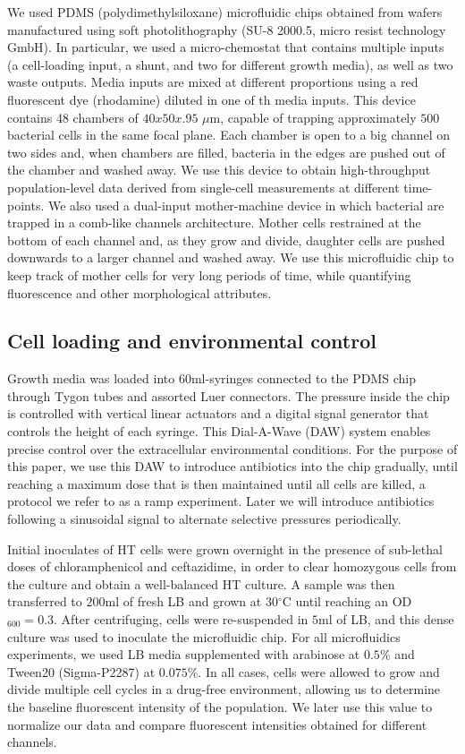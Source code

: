 \documentclass[fleqn,12pt]{wlscirep}
\begin{document}
We used PDMS (polydimethylsiloxane) microfluidic chips obtained from wafers manufactured using soft photolithography (SU-8 2000.5, micro resist technology GmbH).
In particular, we used a micro-chemostat \cite{mondragon2011entrainment} that contains multiple inputs (a cell-loading input, a shunt, and two for different growth media), as well as two waste outputs. Media inputs are mixed at different proportions using a red fluorescent dye (rhodamine) diluted in one of th media inputs. This device contains 48 chambers of $40x50x.95$ $\mu$m, capable of trapping approximately $500$ bacterial cells in the same focal plane.  
Each chamber is open to a big channel on two sides and, when chambers are filled, bacteria in the edges are pushed out of the chamber and washed away. We use this device to obtain high-throughput population-level data derived from single-cell measurements at different time-points.
We also used a dual-input mother-machine \cite{Kaiser2018} device in which bacterial are trapped in a comb-like channels architecture. Mother cells restrained at the bottom of each channel and, as they grow and divide, daughter cells are pushed downwards to a larger channel and washed away. We use this microfluidic chip to keep track of mother cells for very long periods of time, while quantifying fluorescence and other morphological attributes.

\subsection{Cell loading and environmental control}

Growth media was loaded into $60$ml-syringes connected to the PDMS chip through Tygon tubes and assorted Luer connectors. The pressure inside the chip is controlled with vertical linear actuators and a digital signal generator that controls the height of each syringe. 
This Dial-A-Wave (DAW) system\cite{Ferry2011} enables precise control over the extracellular environmental conditions. For the purpose of this paper, we use this DAW to introduce antibiotics into the chip gradually, until reaching a maximum dose that is then maintained until all cells are killed, a protocol we refer to as a ramp experiment.  Later we will introduce antibiotics following a sinusoidal signal to alternate selective pressures periodically.

Initial inoculates of HT cells were grown overnight in the presence of sub-lethal doses of chloramphenicol and ceftazidime, in order to clear homozygous cells from the culture and obtain a well-balanced HT culture.
A sample was then transferred to $200$ml of fresh LB and grown at 30$^{\circ}$C until reaching an OD$_{600}=0.3$.  After centrifuging, cells were re-suspended in $5$ml of LB, and this dense culture was used to inoculate the microfluidic chip. For all microfluidics experiments, we used LB media supplemented with arabinose at $0.5$\% and Tween20 ({Sigma-P2287}) at $0.075$\%. In all cases, cells were allowed to grow and divide multiple cell cycles in a drug-free environment, allowing us to determine the baseline fluorescent intensity of the population. We later use this value to normalize our data and compare fluorescent intensities obtained for different channels.
\end{document}
